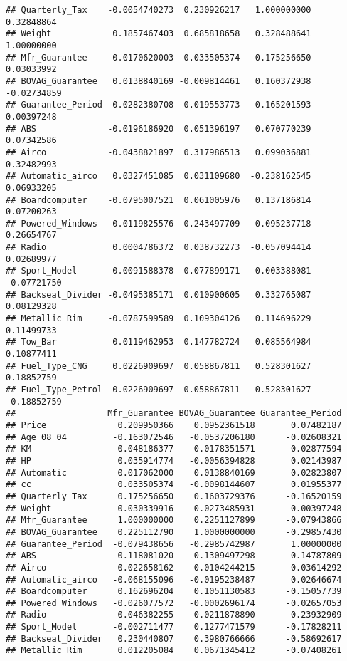 \documentclass[]{article}
\begin{document}
\begin{verbatim}
## Quarterly_Tax    -0.0054740273  0.230926217   1.000000000  0.32848864
## Weight            0.1857467403  0.685818658   0.328488641  1.00000000
## Mfr_Guarantee     0.0170620003  0.033505374   0.175256650  0.03033992
## BOVAG_Guarantee   0.0138840169 -0.009814461   0.160372938 -0.02734859
## Guarantee_Period  0.0282380708  0.019553773  -0.165201593  0.00397248
## ABS              -0.0196186920  0.051396197   0.070770239  0.07342586
## Airco            -0.0438821897  0.317986513   0.099036881  0.32482993
## Automatic_airco   0.0327451085  0.031109680  -0.238162545  0.06933205
## Boardcomputer    -0.0795007521  0.061005976   0.137186814  0.07200263
## Powered_Windows  -0.0119825576  0.243497709   0.095237718  0.26654767
## Radio             0.0004786372  0.038732273  -0.057094414  0.02689977
## Sport_Model       0.0091588378 -0.077899171   0.003388081 -0.07721750
## Backseat_Divider -0.0495385171  0.010900605   0.332765087  0.08129328
## Metallic_Rim     -0.0787599589  0.109304126   0.114696229  0.11499733
## Tow_Bar           0.0119462953  0.147782724   0.085564984  0.10877411
## Fuel_Type_CNG     0.0226909697  0.058867811   0.528301627  0.18852759
## Fuel_Type_Petrol -0.0226909697 -0.058867811  -0.528301627 -0.18852759
##                  Mfr_Guarantee BOVAG_Guarantee Guarantee_Period
## Price              0.209950366    0.0952361518       0.07482187
## Age_08_04         -0.163072546   -0.0537206180      -0.02608321
## KM                -0.048186377   -0.0178351571      -0.02877594
## HP                 0.035914774   -0.0056394828       0.02143987
## Automatic          0.017062000    0.0138840169       0.02823807
## cc                 0.033505374   -0.0098144607       0.01955377
## Quarterly_Tax      0.175256650    0.1603729376      -0.16520159
## Weight             0.030339916   -0.0273485931       0.00397248
## Mfr_Guarantee      1.000000000    0.2251127899      -0.07943866
## BOVAG_Guarantee    0.225112790    1.0000000000      -0.29857430
## Guarantee_Period  -0.079438656   -0.2985742987       1.00000000
## ABS                0.118081020    0.1309497298      -0.14787809
## Airco              0.022658162    0.0104244215      -0.03614292
## Automatic_airco   -0.068155096   -0.0195238487       0.02646674
## Boardcomputer      0.162696204    0.1051130583      -0.15057739
## Powered_Windows   -0.026077572   -0.0002696174      -0.02657053
## Radio             -0.046382255   -0.0211878890       0.23932909
## Sport_Model       -0.002711477    0.1277471579      -0.17828211
## Backseat_Divider   0.230440807    0.3980766666      -0.58692617
## Metallic_Rim       0.012205084    0.0671345412      -0.07408261

\end{verbatim}
\end{document}
